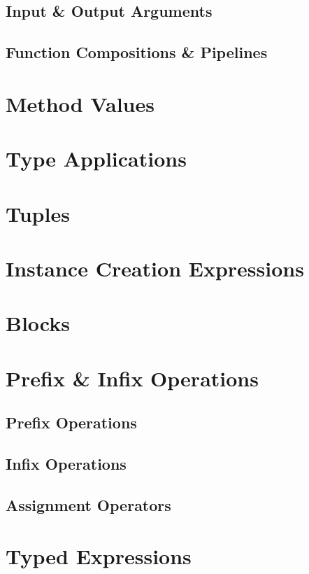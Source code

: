 \subsection{Input \& Output Arguments}

\subsection{Function Compositions \& Pipelines}

\section{Method Values}

\section{Type Applications}

\section{Tuples}

\section{Instance Creation Expressions}

\section{Blocks}

\section{Prefix \& Infix Operations}

\subsection{Prefix Operations}

\subsection{Infix Operations}

\subsection{Assignment Operators}

\section{Typed Expressions}

